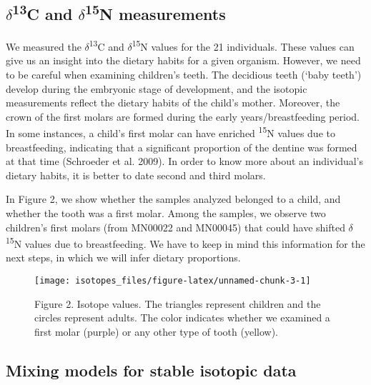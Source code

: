 \documentclass[]{article}
\begin{document}
\hypertarget{delta13c-and-delta15n-measurements}{%
\subsection{\texorpdfstring{\(\delta\)\textsuperscript{13}C and
\(\delta\)\textsuperscript{15}N
measurements}{\textbackslash delta13C and \textbackslash delta15N measurements}}\label{delta13c-and-delta15n-measurements}}

We measured the \(\delta\)\textsuperscript{13}C and
\(\delta\)\textsuperscript{15}N values for the 21 individuals. These
values can give us an insight into the dietary habits for a given
organism. However, we need to be careful when examining children's
teeth. The decidious teeth (`baby teeth') develop during the embryonic
stage of development, and the isotopic measurements reflect the dietary
habits of the child's mother. Moreover, the crown of the first molars
are formed during the early years/breastfeeding period. In some
instances, a child's first molar can have enriched \textsuperscript{15}N
values due to breastfeeding, indicating that a significant proportion of
the dentine was formed at that time (Schroeder et al. 2009). In order to
know more about an individual's dietary habits, it is better to date
second and third molars.

In Figure 2, we show whether the samples analyzed belonged to a child,
and whether the tooth was a first molar. Among the samples, we observe
two children's first molars (from MN00022 and MN00045) that could have
shifted \(\delta\)\textsuperscript{15}N values due to breastfeeding. We
have to keep in mind this information for the next steps, in which we
will infer dietary proportions.

\begin{figure}
\texttt{[image: isotopes\_files/figure-latex/unnamed-chunk-3-1]} \caption{\label{fig:isotope} Figure 2. Isotope values. The triangles represent children and the circles represent adults. The color indicates whether we examined a first molar (purple) or any other type of tooth (yellow).}\label{fig:unnamed-chunk-3}
\end{figure}

\hypertarget{mixing-models-for-stable-isotopic-data}{%
\subsection{Mixing models for stable isotopic
data}\label{mixing-models-for-stable-isotopic-data}}
\end{document}
